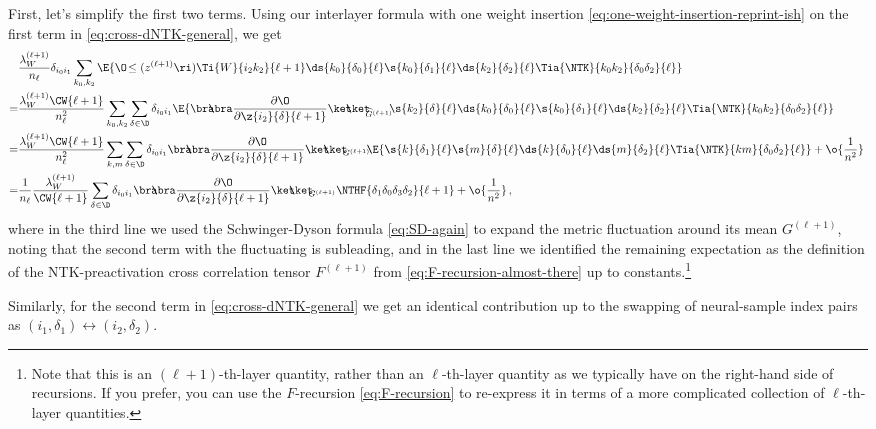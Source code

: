 First, let's simplify the first two terms. %
Using our interlayer formula with one weight insertion \eqref{eq:one-weight-insertion-reprint-ish} on the first term in \eqref{eq:cross-dNTK-general}, we get 
\begin{align}\label{eq:dNTK-cross-correlation-contribution-1}
&\frac{\lambda_{W}^{(\ell+1)}}{n_{\ell}}\delta_{i_0i_1}\sum_{k_0,k_2}\E{\O\!\le(z^{(\ell+1)}\ri)\Ti{W}{i_2 k_2}{\ell+1}\ds{k_0}{\delta_0}{\ell}\s{k_0}{\delta_1}{\ell}\ds{k_2}{\delta_2}{\ell}\Tia{\NTK}{k_0k_2}{\delta_0\delta_2}{\ell}}\, \\
=&\frac{\lambda_{W}^{(\ell+1)} \CW{\ell+1}}{n_{\ell}^2}\sum_{k_0,k_2}\sum_{\delta_{}\in\D}\delta_{i_0i_1}\E{\bra\!\!\!\bra\frac{\partial \O}{\partial \z{i_2}{\delta_{}}{\ell+1}} \ket\!\!\!\ket_{\!\!\!\widehat{G}^{(\ell+1)}}\!\!  \s{k_2}{\delta_{}}{\ell} \ds{k_0}{\delta_0}{\ell}\s{k_0}{\delta_1}{\ell}\ds{k_2}{\delta_2}{\ell}\Tia{\NTK}{k_0k_2}{\delta_0\delta_2}{\ell}}\, \notag\\
=&\frac{\lambda_{W}^{(\ell+1)} \CW{\ell+1}}{n_{\ell}^2}\sum_{k,m}\sum_{\delta_{}\in\D}\delta_{i_0i_1}\bra\!\!\!\bra\frac{\partial \O}{\partial \z{i_2}{\delta_{}}{\ell+1}} \ket\!\!\!\ket_{\!\!\!G^{(\ell+1)}}\!\!\E{\s{k}{\delta_1}{\ell}\s{m}{\delta_{}}{\ell}\ds{k}{\delta_0}{\ell}\ds{m}{\delta_2}{\ell}\Tia{\NTK}{km}{\delta_0\delta_2}{\ell}}+\o{\frac{1}{n^2}}\, \notag\\
=&\frac{1}{n_{\ell}}\frac{\lambda_{W}^{(\ell+1)}}{\CW{\ell+1}}\sum_{\delta_{}\in\D}\delta_{i_0i_1}\bra\!\!\!\bra\frac{\partial \O}{\partial \z{i_2}{\delta_{}}{\ell+1}} \ket\!\!\!\ket_{\!\!\!G^{(\ell+1)}}\NTHF{\delta_1\delta_0\delta_3\delta_2}{\ell+1}+\o{\frac{1}{n^2}}\, ,\notag
\end{align}
where in the third line we used the Schwinger-Dyson formula \eqref{eq:SD-again} to expand the metric fluctuation around its mean $G^{(\ell+1)}$, noting that the second term with the fluctuating is subleading, 
and in the last line we identified the remaining expectation as the definition of the NTK-preactivation cross correlation tensor $F^{(\ell+1)}$ from \eqref{eq:F-recursion-almost-there} up to constants.\footnote{
    Note that this is an $(\ell+1)$-th-layer quantity, rather than an $\ell$-th-layer quantity as we typically have on the right-hand side of recursions. %
    If you prefer, you can use the $F$-recursion \eqref{eq:F-recursion} to re-express it in terms of a more complicated collection of $\ell$-th-layer quantities.
}

Similarly, for the second term in \eqref{eq:cross-dNTK-general} we get an identical contribution up to the swapping of neural-sample index pairs as $(i_1,\delta_1)\leftrightarrow(i_2,\delta_2)$.


